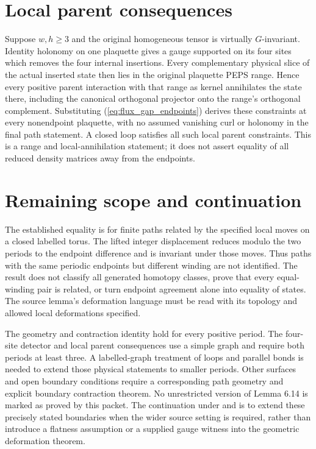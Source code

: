 \documentclass{article}
\begin{document}
\section{Local parent consequences}
Suppose $w,h\geq3$ and the original homogeneous tensor is virtually
$G$-invariant. Identity holonomy on one plaquette gives a gauge supported
on its four sites which removes the four internal insertions. Every
complementary physical slice of the actual inserted state then lies in
the original plaquette PEPS range. Hence every positive parent interaction
with that range as kernel annihilates the state there, including the
canonical orthogonal projector onto the range's orthogonal complement.
Substituting (\ref{eq:flux_gap_endpoints}) derives these constraints at
every nonendpoint plaquette, with no assumed vanishing curl or holonomy
in the final path statement. A closed loop satisfies all such local
parent constraints. This is a range and local-annihilation statement;
it does not assert equality of all reduced density matrices away from
the endpoints.

\section{Remaining scope and continuation}
The established equality is for finite paths related by the specified
local moves on a closed labelled torus. The lifted integer displacement
reduces modulo the two periods to the endpoint difference and is
invariant under those moves. Thus paths with the same periodic
endpoints but different winding are not identified. The result does not
classify all generated homotopy classes, prove that every equal-winding
pair is related, or turn endpoint agreement alone into equality of states.
The source lemma's deformation language must be read with its topology
and allowed local deformations specified.

The geometry and contraction identity hold for every positive period.
The four-site detector and local parent consequences use a simple graph
and require both periods at least three. A labelled-graph treatment of
loops and parallel bonds is needed to extend those physical statements
to smaller periods. Other surfaces and open boundary conditions require
a corresponding path geometry and explicit boundary contraction theorem.
No unrestricted version of Lemma 6.14 is marked as proved by this packet.
The continuation under  and  is to extend these
precisely stated boundaries when the wider source setting is required,
rather than introduce a flatness assumption or a supplied gauge witness
into the geometric deformation theorem.
\end{document}
